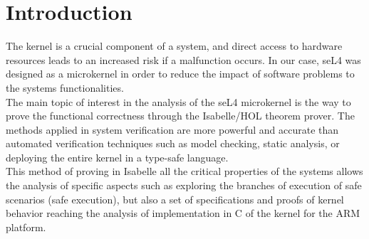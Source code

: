 \documentclass[conference]{IEEEtran}
\begin{document}
\section{Introduction}
The kernel is a crucial component of a system, and direct access to hardware resources leads to an increased risk if a malfunction occurs. In our case, seL4 was designed as a microkernel in order to reduce the impact of software problems to the system\textquotesingle s functionalities.\\
The main topic of interest in the analysis of the seL4 microkernel is the way to prove the functional correctness through the Isabelle/HOL theorem prover. The methods applied in system verification are more powerful and accurate than automated verification techniques such as model checking, static analysis, or deploying the entire kernel in a type-safe language. \\
This method of proving in Isabelle all the critical properties of the systems allows the analysis of specific aspects such as exploring the branches of execution of safe scenarios (safe execution), but also a set of specifications and proofs of kernel behavior reaching the analysis of implementation in C of the kernel for the ARM platform.
\end{document}
